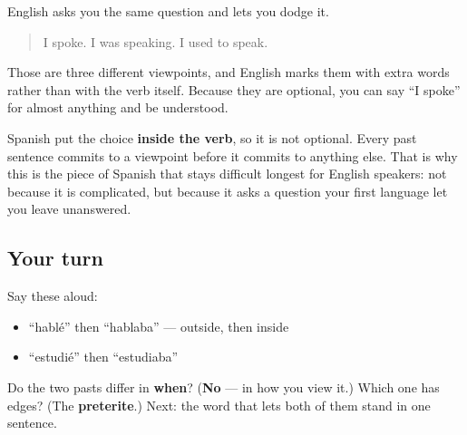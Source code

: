\begin{culture}
English asks you the same question and lets you dodge it.

\begin{quote}
I spoke. I was speaking. I used to speak.
\end{quote}

Those are three different viewpoints, and English marks them with extra words rather than with the verb itself. Because they are optional, you can say \textquotedblleft{}I spoke\textquotedblright{} for almost anything and be understood.

Spanish put the choice \textbf{inside the verb}, so it is not optional. Every past sentence commits to a viewpoint before it commits to anything else. That is why this is the piece of Spanish that stays difficult longest for English speakers: not because it is complicated, but because it asks a question your first language let you leave unanswered.
\end{culture}

\subsection*{Your turn}
Say these aloud:

\begin{itemize}
\raggedright
  \item \textquotedblleft{}hablé\textquotedblright{} then \textquotedblleft{}hablaba\textquotedblright{} — outside, then inside
  \item \textquotedblleft{}estudié\textquotedblright{} then \textquotedblleft{}estudiaba\textquotedblright{}
\end{itemize}

\begin{tcolorbox}[breakable,colback=teal!4,colframe=teal!35!black,title={Before you move on}]
Do the two pasts differ in \textbf{when}? (\textbf{No} — in how you view it.) Which one has edges? (The \textbf{preterite}.) Next: the word that lets both of them stand in one sentence.
\end{tcolorbox}
